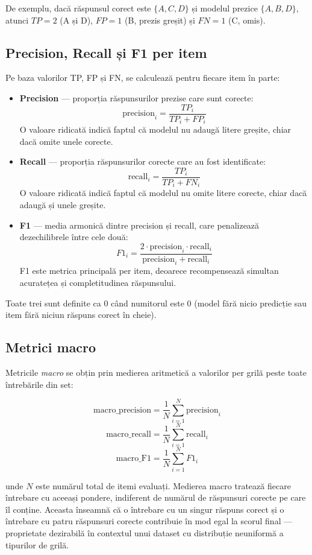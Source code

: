 \documentclass[12pt, a4paper, oneside, romanian]{teza-upb}
\begin{document}
De exemplu, dacă răspunsul corect este $\{A, C, D\}$ și modelul prezice $\{A, B, D\}$, atunci $TP = 2$ (A și D), $FP = 1$ (B, prezis greșit) și $FN = 1$ (C, omis).

\subsection{Precision, Recall și F1 per item}

Pe baza valorilor TP, FP și FN, se calculează pentru fiecare item în parte:

\begin{itemize}
    \item \textbf{Precision} --- proporția răspunsurilor prezise care sunt corecte:
    \[ \text{precision}_i = \frac{TP_i}{TP_i + FP_i} \]
    O valoare ridicată indică faptul că modelul nu adaugă litere greșite, chiar dacă omite unele corecte.

    \item \textbf{Recall} --- proporția răspunsurilor corecte care au fost identificate:
    \[ \text{recall}_i = \frac{TP_i}{TP_i + FN_i} \]
    O valoare ridicată indică faptul că modelul nu omite litere corecte, chiar dacă adaugă și unele greșite.

    \item \textbf{F1} --- media armonică dintre precision și recall, care penalizează dezechilibrele între cele două:
    \[ F1_i = \frac{2 \cdot \text{precision}_i \cdot \text{recall}_i}{\text{precision}_i + \text{recall}_i} \]
    F1 este metrica principală per item, deoarece recompensează simultan acuratețea și completitudinea răspunsului.
\end{itemize}

Toate trei sunt definite ca $0$ când numitorul este $0$ (model fără nicio predicție sau item fără niciun răspuns corect în cheie).

\subsection{Metrici macro}

Metricile \textit{macro} se obțin prin medierea aritmetică a valorilor per grilă peste toate întrebările din set:

\[ \text{macro\_precision} = \frac{1}{N} \sum_{i=1}^{N} \text{precision}_i \]
\[ \text{macro\_recall} = \frac{1}{N} \sum_{i=1}^{N} \text{recall}_i \]
\[ \text{macro\_F1} = \frac{1}{N} \sum_{i=1}^{N} F1_i \]

unde $N$ este numărul total de itemi evaluați. Medierea macro tratează fiecare întrebare cu aceeași pondere, indiferent de numărul de răspunsuri corecte pe care îl conține. Aceasta înseamnă că o întrebare cu un singur răspuns corect și o întrebare cu patru răspunsuri corecte contribuie în mod egal la scorul final --- proprietate dezirabilă în contextul unui dataset cu distribuție neuniformă a tipurilor de grilă.
\end{document}
